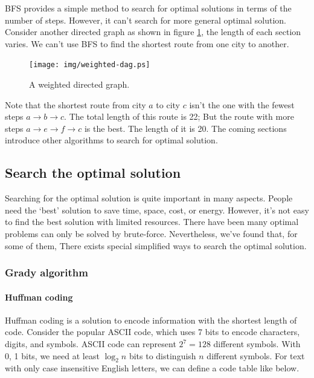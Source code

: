 \documentclass[UTF8]{article}
\begin{document}
BFS provides a simple method to search for optimal solutions in terms of the number
of steps. However, it can't search for more general optimal solution.
Consider another directed graph as shown in figure \ref{fig:weighted-dag}, the length of
each section varies. We can't use BFS to find the shortest route from one city to
another.

\begin{figure}[htbp]
 \centering
 \texttt{[image: img/weighted-dag.ps]}
 \caption{A weighted directed graph.}
 \label{fig:weighted-dag}
\end{figure}

Note that the shortest route from city $a$ to city $c$ isn't the one with the fewest steps
$a \to b \to c$. The total length of this route is 22; But the route with more steps
$a \to e \to f \to c$ is the best. The length of it is 20. The coming sections
introduce other algorithms to search for optimal solution.

\subsection{Search the optimal solution}
Searching for the optimal solution is quite important in many aspects. People need the `best'
solution to save time, space, cost, or energy. However, it's not easy to find the
best solution with limited resources. There have been many optimal problems can
only be solved by brute-force. Nevertheless, we've found that, for some of them,
There exists special simplified ways to search the optimal solution.

\subsubsection{Grady algorithm}

\paragraph{Huffman coding}
Huffman coding is a solution to encode information with the shortest length of
code. Consider the popular ASCII code, which uses 7 bits to encode characters, digits,
and symbols. ASCII code can represent $2^7 = 128$ different symbols. With 0, 1 bits,
we need at least $\log_2 n$ bits to distinguish $n$ different symbols. For text with
only case insensitive English letters, we can define a code table like below.
\end{document}
